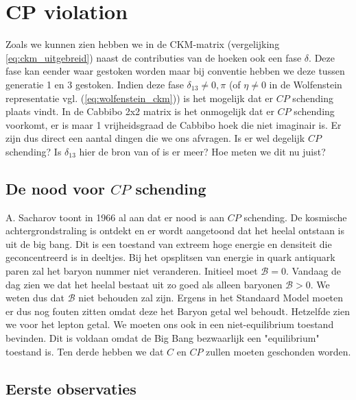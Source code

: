 \documentclass[../main.tex]{subfiles}
\begin{document}
\section{CP violation}%
\label{sec:cp_violation}

Zoals we kunnen zien hebben we in de CKM-matrix (vergelijking \ref{eq:ckm_uitgebreid}) naast de contributies van de hoeken ook een fase $\delta$. Deze fase kan eender waar gestoken worden maar bij conventie hebben we deze tussen generatie 1 en 3 gestoken. Indien deze fase $\delta_{13}\neq 0,\pi$ (of $\eta\neq 0$ in de Wolfenstein representatie vgl. (\ref{eq:wolfenstein_ckm})) is het mogelijk dat er $CP$ schending plaats vindt. In de Cabbibo 2x2 matrix is het onmogelijk dat er $CP$ schending voorkomt, er is maar 1 vrijheidsgraad de Cabbibo hoek die niet imaginair is. Er zijn dus direct een aantal dingen die we ons afvragen. Is er wel degelijk $CP$ schending? Is $\delta_{13}$ hier de bron van of is er meer? Hoe meten we dit nu juist?

\subsection{De nood voor $CP$ schending}%
\label{sub:de_nood_voor_cp_schending}

A. Sacharov toont in 1966 al aan dat er nood is aan $CP$ schending. De kosmische achtergrondstraling is ontdekt en er wordt aangetoond dat het heelal ontstaan is uit de big bang. Dit is een toestand van extreem hoge energie en densiteit die geconcentreerd is in deeltjes. Bij het opsplitsen van energie in quark antiquark paren zal het baryon nummer niet veranderen. Initieel moet $\mathcal{B}=0$. Vandaag de dag zien we dat het heelal bestaat uit zo goed als alleen baryonen $\mathcal{B}>0$. We weten dus dat $\mathcal{B}$ niet behouden zal zijn. Ergens in het Standaard Model moeten er dus nog fouten zitten omdat deze het Baryon getal wel behoudt. Hetzelfde zien we voor het lepton getal. We moeten ons ook in een niet-equilibrium toestand bevinden. Dit is voldaan omdat de Big Bang bezwaarlijk een "equilibrium" toestand is. Ten derde hebben we dat $C$ en $CP$ zullen moeten geschonden worden.

\subsection{Eerste observaties}%
\label{sub:eerste_observaties}
\end{document}

